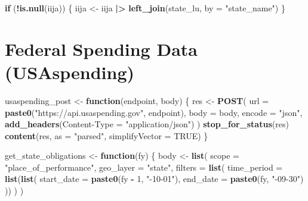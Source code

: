 \documentclass[
  11pt,
]{article}
\newenvironment{Shaded}{\begin{snugshade}}{\end{snugshade}}
\newcommand{\AttributeTok}[1]{\textcolor[rgb]{0.13,0.29,0.53}{#1}}
\newcommand{\ConstantTok}[1]{\textcolor[rgb]{0.56,0.35,0.01}{#1}}
\newcommand{\ControlFlowTok}[1]{\textcolor[rgb]{0.13,0.29,0.53}{\textbf{#1}}}
\newcommand{\DecValTok}[1]{\textcolor[rgb]{0.00,0.00,0.81}{#1}}
\newcommand{\FunctionTok}[1]{\textcolor[rgb]{0.13,0.29,0.53}{\textbf{#1}}}
\newcommand{\NormalTok}[1]{#1}
\newcommand{\OtherTok}[1]{\textcolor[rgb]{0.56,0.35,0.01}{#1}}
\newcommand{\SpecialCharTok}[1]{\textcolor[rgb]{0.81,0.36,0.00}{\textbf{#1}}}
\newcommand{\StringTok}[1]{\textcolor[rgb]{0.31,0.60,0.02}{#1}}
\begin{document}
\begin{Shaded}
\begin{Highlighting}[]
\ControlFlowTok{if}\NormalTok{ (}\SpecialCharTok{!}\FunctionTok{is.null}\NormalTok{(iija)) \{}
\NormalTok{  iija }\OtherTok{\textless{}{-}}\NormalTok{ iija }\SpecialCharTok{|\textgreater{}}
    \FunctionTok{left\_join}\NormalTok{(state\_lu, }\AttributeTok{by =} \StringTok{"state\_name"}\NormalTok{)}
\NormalTok{\}}
\end{Highlighting}
\end{Shaded}

\section{Federal Spending Data
(USAspending)}\label{federal-spending-data-usaspending}

\begin{Shaded}
\begin{Highlighting}[]
\NormalTok{usaspending\_post }\OtherTok{\textless{}{-}} \ControlFlowTok{function}\NormalTok{(endpoint, body) \{}
\NormalTok{  res }\OtherTok{\textless{}{-}} \FunctionTok{POST}\NormalTok{(}
    \AttributeTok{url =} \FunctionTok{paste0}\NormalTok{(}\StringTok{"https://api.usaspending.gov"}\NormalTok{, endpoint),}
    \AttributeTok{body =}\NormalTok{ body,}
    \AttributeTok{encode =} \StringTok{"json"}\NormalTok{,}
    \FunctionTok{add\_headers}\NormalTok{(}\StringTok{\textasciigrave{}}\AttributeTok{Content{-}Type}\StringTok{\textasciigrave{}} \OtherTok{=} \StringTok{"application/json"}\NormalTok{)}
\NormalTok{  )}
  \FunctionTok{stop\_for\_status}\NormalTok{(res)}
  \FunctionTok{content}\NormalTok{(res, }\AttributeTok{as =} \StringTok{"parsed"}\NormalTok{, }\AttributeTok{simplifyVector =} \ConstantTok{TRUE}\NormalTok{)}
\NormalTok{\}}

\NormalTok{get\_state\_obligations }\OtherTok{\textless{}{-}} \ControlFlowTok{function}\NormalTok{(fy) \{}
\NormalTok{  body }\OtherTok{\textless{}{-}} \FunctionTok{list}\NormalTok{(}
    \AttributeTok{scope =} \StringTok{"place\_of\_performance"}\NormalTok{,}
    \AttributeTok{geo\_layer =} \StringTok{"state"}\NormalTok{,}
    \AttributeTok{filters =} \FunctionTok{list}\NormalTok{(}
      \AttributeTok{time\_period =} \FunctionTok{list}\NormalTok{(}\FunctionTok{list}\NormalTok{(}
        \AttributeTok{start\_date =} \FunctionTok{paste0}\NormalTok{(fy }\SpecialCharTok{{-}} \DecValTok{1}\NormalTok{, }\StringTok{"{-}10{-}01"}\NormalTok{),}
        \AttributeTok{end\_date   =} \FunctionTok{paste0}\NormalTok{(fy, }\StringTok{"{-}09{-}30"}\NormalTok{)}
\NormalTok{      ))}
\NormalTok{    )}
\NormalTok{  )}


\end{Highlighting}
\end{Shaded}
\end{document}

